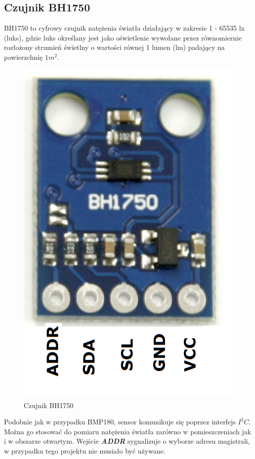 \documentclass[polish, 11pt]{article}
\begin{document}
\subsection{Czujnik BH1750}
BH1750 to cyfrowy czujnik natężenia światła działający w zakresie 1 - 65535 lx (luks), gdzie luks określany jest jako oświetlenie wywołane przez równomiernie rozłożony strumień świetlny o wartości równej 1 lumen (lm) padający na powierzchnię $1 m^2$. 

\begin{figure}[H]
    \centering
    \includegraphics[scale=0.2]{BH1750.png}
\caption{Czujnik BH1750}
\end{figure}
Podobnie jak w przypadku BMP180, sensor komunikuje się poprzez interfejs $I^2C$. Można go stosować do pomiaru natężenia światła zarówno w pomieszczeniach jak i w obszarze otwartym. Wejście \textbf{\textit{ADDR}} sygnalizuje o wyborze adresu magistrali, w przypadku tego projektu nie musiało być używane. 
\end{document}
